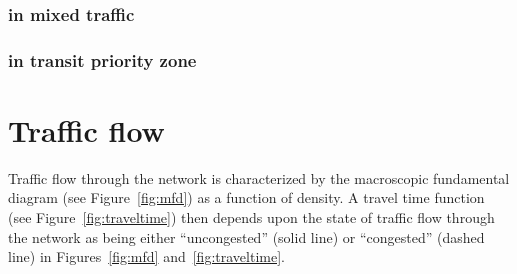 \documentclass{article}
\begin{document}
\subsubsection{in mixed traffic}
\subsubsection{in transit priority zone}


\section{Traffic flow}
Traffic flow through the network is characterized by the macroscopic fundamental diagram (see Figure~\ref{fig:mfd}) as a function of density. A travel time function (see Figure~\ref{fig:traveltime}) then depends upon the state of traffic flow through the network as being either ``uncongested'' (solid line) or ``congested'' (dashed line) in Figures~\ref{fig:mfd} and~\ref{fig:traveltime}.
\end{document}

